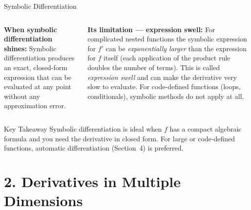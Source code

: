 \documentclass[aspectratio=169,10pt]{beamer}
\begin{document}
\begin{frame}[allowframebreaks]{Symbolic Differentiation}
\begin{columns}[T]
    \textbf{When symbolic differentiation shines:}
    Symbolic differentiation produces an exact, closed-form expression
    that can be evaluated at any point without any approximation error.

    \medskip
    \textbf{Its limitation --- expression swell:}
    For complicated nested functions the symbolic expression for $f'$
    can be \emph{exponentially larger} than the expression for $f$ itself
    (each application of the product rule doubles the number of terms).
    This is called \emph{expression swell} and can make the derivative
    very slow to evaluate.  For code-defined functions (loops, conditionals),
    symbolic methods do not apply at all.
  \end{columns}

  \begin{alertblock}{Key Takeaway}
    Symbolic differentiation is ideal when $f$ has a compact algebraic
    formula and you need the derivative in closed form.  For large or
    code-defined functions, automatic differentiation (Section~4) is
    preferred.
  \end{alertblock}

\end{frame}

\section{2. Derivatives in Multiple Dimensions}
\end{document}
